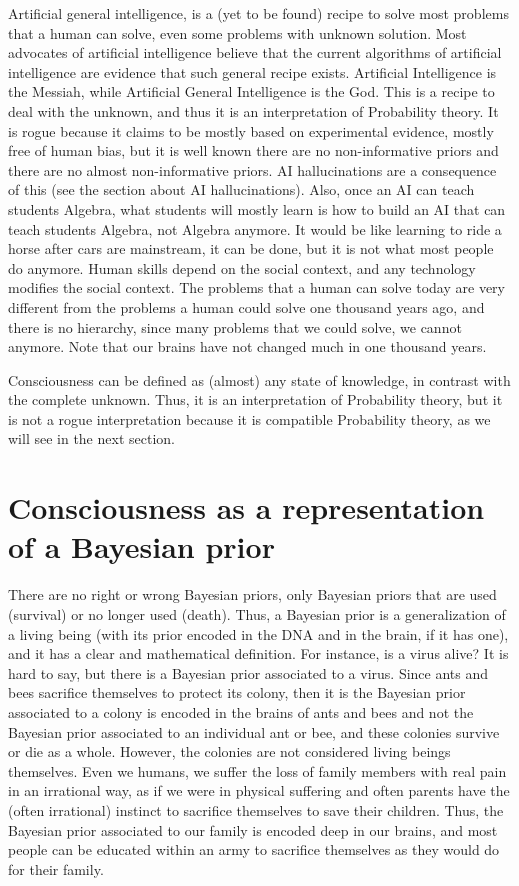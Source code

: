 \documentclass[11pt]{book}
\begin{document}
Artificial general intelligence, is a (yet to be found) recipe to solve
most problems that a human can solve, even some problems with unknown
solution. Most advocates of artificial intelligence believe that the
current algorithms of artificial intelligence are evidence that such
general recipe exists. Artificial Intelligence is the Messiah, while
Artificial General Intelligence is the God. This is a recipe to deal
with the unknown, and thus it is an interpretation of Probability
theory. It is rogue because it claims to be mostly based on experimental
evidence, mostly free of human bias, but it is well known there are no
non-informative priors and there are no almost non-informative priors.
AI hallucinations are a consequence of this (see the section about AI
hallucinations). Also, once an AI can teach students Algebra, what
students will mostly learn is how to build an AI that can teach students
Algebra, not Algebra anymore. It would be like learning to ride a horse
after cars are mainstream, it can be done, but it is not what most
people do anymore. Human skills depend on the social context, and any
technology modifies the social context. The problems that a human can
solve today are very different from the problems a human could solve one
thousand years ago, and there is no hierarchy, since many problems that
we could solve, we cannot anymore. Note that our brains have not changed
much in one thousand years.

Consciousness can be defined as (almost) any state of knowledge, in
contrast with the complete unknown. Thus, it is an interpretation of
Probability theory, but it is not a rogue interpretation because it is
compatible Probability theory, as we will see in the next section.

\hypertarget{consciousness-as-a-representation-of-a-bayesian-prior}{%
\section{Consciousness as a representation of a Bayesian
prior}\label{consciousness-as-a-representation-of-a-bayesian-prior}}

There are no right or wrong Bayesian priors, only Bayesian priors that
are used (survival) or no longer used (death). Thus, a Bayesian prior is
a generalization of a living being (with its prior encoded in the DNA
and in the brain, if it has one), and it has a clear and mathematical
definition. For instance, is a virus alive? It is hard to say, but there
is a Bayesian prior associated to a virus. Since ants and bees sacrifice
themselves to protect its colony, then it is the Bayesian prior
associated to a colony is encoded in the brains of ants and bees and not
the Bayesian prior associated to an individual ant or bee, and these
colonies survive or die as a whole. However, the colonies are not
considered living beings themselves. Even we humans, we suffer the loss
of family members with real pain in an irrational way, as if we were in
physical suffering and often parents have the (often irrational)
instinct to sacrifice themselves to save their children. Thus, the
Bayesian prior associated to our family is encoded deep in our brains,
and most people can be educated within an army to sacrifice themselves
as they would do for their family.
\end{document}
